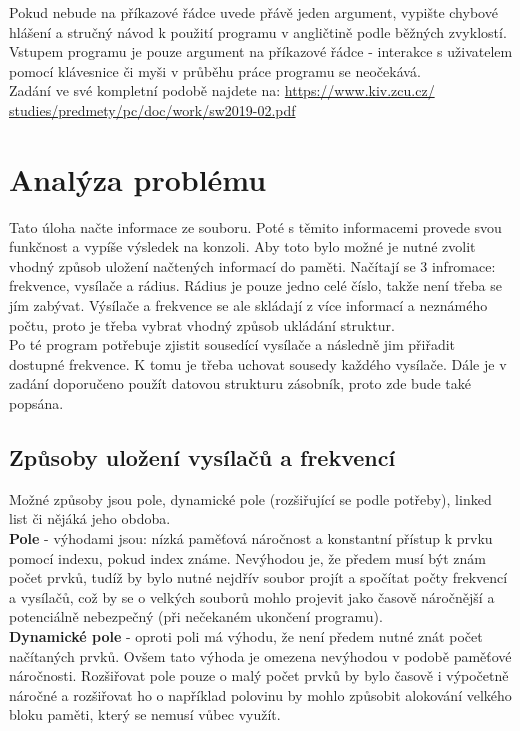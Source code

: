 \documentclass[12pt]{article}
\begin{document}
Pokud nebude na příkazové řádce uvede přávě jeden argument, vypište chybové
hlášení a stručný návod k použití programu v angličtině podle běžných 
zvyklostí. Vstupem programu je pouze argument na příkazové řádce - interakce
s uživatelem pomocí klávesnice či myši v průběhu práce programu se neočekává.\\

Zadání ve své kompletní podobě najdete na: \url{https://www.kiv.zcu.cz/
studies/predmety/pc/doc/work/sw2019-02.pdf}\\
%
%
\pagebreak
%
\section{Analýza problému}
%
Tato úloha načte informace ze souboru. Poté s těmito informacemi provede svou 
funkčnost a vypíše výsledek na konzoli. Aby toto bylo možné je nutné zvolit
vhodný způsob uložení načtených informací do paměti. Načítají se 3 infromace: 
frekvence, vysílače a rádius. Rádius je pouze jedno celé číslo, takže není 
třeba se jím zabývat. Výsílače a frekvence se ale skládají z více informací 
a neznámého počtu, proto je třeba vybrat vhodný způsob ukládání struktur.\\

Po té program potřebuje zjistit sousedící vysílače a následně jim přiřadit 
dostupné frekvence. K tomu je třeba uchovat sousedy každého vysílače.
Dále je v zadání doporučeno použít datovou strukturu zásobník, proto zde bude
také popsána.
%
\subsection{Způsoby uložení vysílačů a frekvencí}
%
Možné způsoby jsou pole, dynamické pole (rozšiřující se podle potřeby), linked 
list či nějáká jeho obdoba.\\

\textbf{Pole} - výhodami jsou: nízká paměťová náročnost a konstantní přístup
k prvku pomocí indexu, pokud index známe. Nevýhodou je, že předem musí být 
znám počet prvků, tudíž by bylo nutné nejdřív soubor projít a spočítat počty 
frekvencí a vysílačů, což by se o velkých souborů mohlo projevit jako časově 
náročnější a potenciálně nebezpečný (při nečekaném ukončení programu).\\

\textbf{Dynamické pole} - oproti poli má výhodu, že není předem nutné znát 
počet načítaných prvků. Ovšem tato výhoda je omezena nevýhodou v podobě 
paměťové náročnosti. Rozšiřovat pole pouze o malý počet prvků by bylo 
časově i výpočetně náročné a rozšiřovat ho o například polovinu by mohlo 
způsobit alokování velkého bloku paměti, který se nemusí vůbec využít.\\
\end{document}
